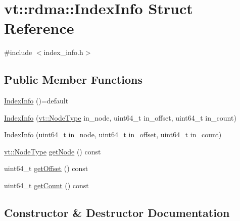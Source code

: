 \hypertarget{structvt_1_1rdma_1_1_index_info}{}\section{vt\+:\+:rdma\+:\+:Index\+Info Struct Reference}
\label{structvt_1_1rdma_1_1_index_info}


{\ttfamily \#include $<$index\+\_\+info.\+h$>$}

\subsection*{Public Member Functions}
\begin{DoxyCompactItemize}
\item 
\hyperlink{structvt_1_1rdma_1_1_index_info_af6a666e4d7d971e0760fc4b0d2fee7df}{Index\+Info} ()=default
\item 
\hyperlink{structvt_1_1rdma_1_1_index_info_a3e2a60b3dbc28c2c67e6bbf6d5cdaba1}{Index\+Info} (\hyperlink{namespacevt_a866da9d0efc19c0a1ce79e9e492f47e2}{vt\+::\+Node\+Type} in\+\_\+node, uint64\+\_\+t in\+\_\+offset, uint64\+\_\+t in\+\_\+count)
\item 
\hyperlink{structvt_1_1rdma_1_1_index_info_a5722f4ee5d85747af1068b09506c8ff8}{Index\+Info} (uint64\+\_\+t in\+\_\+node, uint64\+\_\+t in\+\_\+offset, uint64\+\_\+t in\+\_\+count)
\item 
\hyperlink{namespacevt_a866da9d0efc19c0a1ce79e9e492f47e2}{vt\+::\+Node\+Type} \hyperlink{structvt_1_1rdma_1_1_index_info_a94944747d01e14bb229837b048067c4f}{get\+Node} () const
\item 
uint64\+\_\+t \hyperlink{structvt_1_1rdma_1_1_index_info_ad69b51477f01c99fe3b636ba49477138}{get\+Offset} () const
\item 
uint64\+\_\+t \hyperlink{structvt_1_1rdma_1_1_index_info_ae93f18d7a207ba517af6f7cd06a938bb}{get\+Count} () const
\end{DoxyCompactItemize}


\subsection{Constructor \& Destructor Documentation}
\mbox{\label{structvt_1_1rdma_1_1_index_info_af6a666e4d7d971e0760fc4b0d2fee7df}} 

